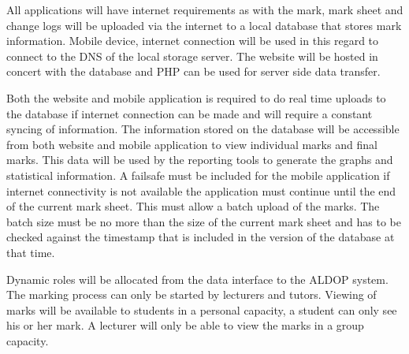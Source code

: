 \documentclass[12pt, a4paper]{scrartcl}
\begin{document}
			All applications will have internet requirements as with the mark, mark sheet and change logs will be uploaded via the internet to a local database that stores mark information. Mobile device, internet connection will be used in this regard to connect to the DNS of the local storage server. The website will be hosted in concert with the database and PHP can be used for server side data transfer.

			Both the website and mobile application is required to do real time uploads to the database if internet connection can be made and will require a constant syncing of information. The information stored on the database will be accessible from both website and mobile application to view individual marks and final marks. This data will be used by the reporting tools to generate the graphs and statistical information. A failsafe must be included for the mobile application if internet connectivity is not available the application must continue until the end of the current mark sheet. This must allow a batch upload of the marks. The batch size must be no more than the size of the current mark sheet and has to be checked against the timestamp that is included in the version of the database at that time.

			Dynamic roles will be allocated from the data interface to the ALDOP system. The marking process can only be started by lecturers and tutors. Viewing of marks will be available to students in a personal capacity, a student can only see his or her mark. A lecturer will only be able to view the marks in a group capacity.
\end{document}
